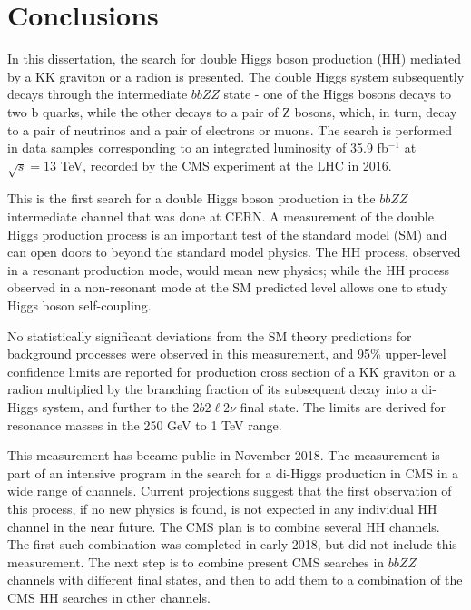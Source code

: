 \chapter{Conclusions}
\label{ch:Conclusions}

In this dissertation, the search for double Higgs boson production (HH) mediated by a KK graviton or a radion is presented. The double Higgs system subsequently decays through the intermediate $bbZZ$ state - one of the Higgs bosons decays to two b quarks, while the other decays to a pair of Z bosons, which, in turn, decay to a pair of neutrinos and a pair of electrons or muons. The search is performed in data samples corresponding to an integrated luminosity of 35.9 fb$^{-1}$ at $\sqrt s =13$ TeV, recorded by the CMS experiment at the LHC in 2016. 

This is the first search for a double Higgs boson production in the $bbZZ$ intermediate channel that was done at CERN. A measurement of the double Higgs production process is an important test of the standard model (SM) and can open doors to beyond the standard model physics. The HH process, observed in a resonant production mode, would mean new physics; while the HH process observed in a non-resonant mode at the SM predicted level allows one to study Higgs boson self-coupling. 

No statistically significant deviations from the SM theory predictions for background processes were observed in this measurement, and 95\% upper-level confidence limits are reported for production cross section of a KK graviton or a radion multiplied by the branching fraction of its subsequent decay into a di-Higgs system, and further to the $2 b 2 \ell 2 \nu$ final state. The limits are derived for resonance masses in the 250 GeV to 1 TeV range.

This measurement has became public in November 2018. The measurement is part of an intensive program in the search for a di-Higgs production in CMS in a wide range of channels. Current projections suggest that the first observation of this process, if no new physics is found, is not expected in any individual HH channel in the near future. The CMS plan is to combine several HH channels. The first such combination was completed in early 2018, but did not include this measurement. The next step is to combine present CMS searches in $bbZZ$ channels with different final states, and then to add them to a combination of the CMS HH searches in other channels.
